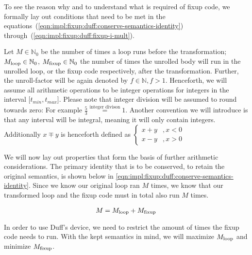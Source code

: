 To see the reason why and to understand what is required of fixup code, we formally lay out conditions that need to be met in the equations~(\ref{eqn:impl:fixup:duff:conserve-semantics-identity}) through~(\ref{eqn:impl:fixup:duff:fixup-i-mult}).

Let $M \in \mathbb{N}_0$ be the number of times a loop runs before the transformation; $M_{\text{loop}} \in \mathbb{N}_0$, $M_{\text{fixup}} \in \mathbb{N}_0$ the number of times the unrolled body will run in the unrolled loop, or the fixup code respectively, after the transformation.
Further, the unroll-factor will be again denoted by $f \in \mathbb{N}, f > 1$.
Henceforth, we will assume all arithmetic operations to be integer operations for integers in the interval $\lbrack t_{min}, t_{max} \rbrack$.
Please note that integer division will be assumed to round towards zero: For example $\frac{5}{3} \overset{\text{integer divison}}{=} 1$.
Another convention we will introduce is that any interval will be integral, meaning it will only contain integers.
Additionally $x \mp y$ is henceforth defined as
$\begin{cases}
     x + y &, x < 0\\
     x - y &, x > 0
\end{cases}$

We will now lay out properties that form the basis of further arithmetic considerations.
The primary identity that is to be conserved, to retain the original semantics, is shown below in \cref{eqn:impl:fixup:duff:conserve-semantics-identity}.
Since we know our original loop ran $M$ times, we know that our transformed loop and the fixup code must in total also run $M$ times.

\begin{equation}\label{eqn:impl:fixup:duff:conserve-semantics-identity}
\begin{aligned}
    M = M_{\text{loop}} + M_{\text{fixup}}
\end{aligned}
\end{equation}

In order to use Duff's device, we need to restrict the amount of times the fixup code needs to run.
With the kept semantics in mind, we will maximize $M_{\text{loop}}$ and minimize $M_{\text{fixup}}$.

